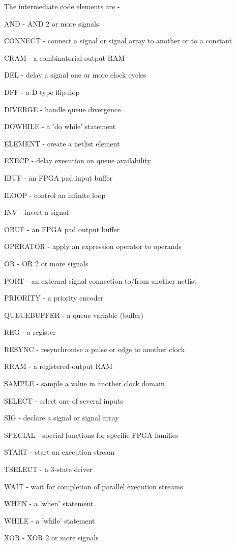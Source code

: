     The intermediate code elements are -
    \blist
    \item   AND -       AND 2 or more signals
    \item   CONNECT -   connect a signal or signal array to another or to a
                        constant
    \item   CRAM -      a combinatorial-output RAM
    \item   DEL -       delay a signal one or more clock cycles
    \item   DFF -       a D-type flip-flop
    \item   DIVERGE -   handle queue divergence
    \item   DOWHILE -   a 'do while' statement
    \item   ELEMENT -   create a netlist element
    \item   EXECP -     delay execution on queue availability
    \item   IBUF -      an FPGA pad input buffer
    \item   ILOOP -     control an infinite loop
    \item   INV -       invert a signal
    \item   OBUF -      an FPGA pad output buffer
    \item   OPERATOR -  apply an expression operator to operands
    \item   OR -        OR 2 or more signals
    \item   PORT -      an external signal connection to/from another netlist
    \item   PRIORITY -  a priority encoder
    \item   QUEUEBUFFER - a queue variable (buffer)
    \item   REG -       a register
    \item   RESYNC -    resynchronise a pulse or edge to another clock
    \item   RRAM -      a registered-output RAM
    \item   SAMPLE -    sample a value in another clock domain
    \item   SELECT -    select one of several inputs
    \item   SIG -       declare a signal or signal array
    \item   SPECIAL -   special functions for specific FPGA families
    \item   START -     start an execution stream
    \item   TSELECT -   a 3-state driver
    \item   WAIT -      wait for completion of parallel execution streams
    \item   WHEN -      a 'when' statement
    \item   WHILE -     a 'while' statement
    \item   XOR -       XOR 2 or more signals
    \blend
    

